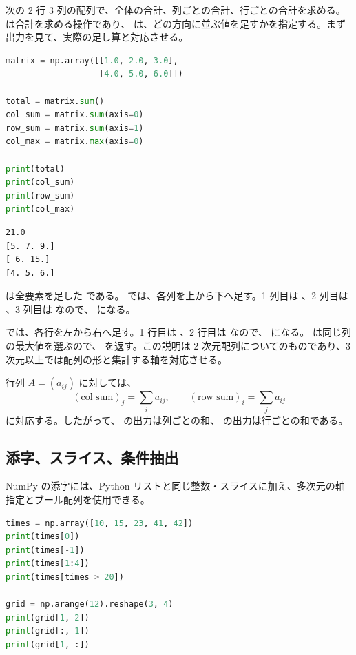 次の 2 行 3 列の配列で、全体の合計、列ごとの合計、行ごとの合計を求める。 は合計を求める操作であり、 は、どの方向に並ぶ値を足すかを指定する。まず出力を見て、実際の足し算と対応させる。

\begin{lstlisting}[language=Python]
matrix = np.array([[1.0, 2.0, 3.0],
                   [4.0, 5.0, 6.0]])

total = matrix.sum()
col_sum = matrix.sum(axis=0)
row_sum = matrix.sum(axis=1)
col_max = matrix.max(axis=0)

print(total)
print(col_sum)
print(row_sum)
print(col_max)
\end{lstlisting}

\begin{lstlisting}[numbers=none, xleftmargin=2\zw]
21.0
[5. 7. 9.]
[ 6. 15.]
[4. 5. 6.]
\end{lstlisting}

 は全要素を足した  である。 では、各列を上から下へ足す。1 列目は 、2 列目は 、3 列目は  なので、\code{[5., 7., 9.]} になる。

 では、各行を左から右へ足す。1 行目は 、2 行目は  なので、\code{[6., 15.]} になる。 は同じ列の最大値を選ぶので、\code{[4., 5., 6.]} を返す。この説明は 2 次元配列についてのものであり、3 次元以上では配列の形と集計する軸を対応させる。

行列 \(A = (a_{ij})\) に対しては、
\[
(\mathrm{col\_sum})_j = \sum_i a_{ij},\qquad
(\mathrm{row\_sum})_i = \sum_j a_{ij}
\]
に対応する。したがって、 の出力は列ごとの和、 の出力は行ごとの和である。

\subsection{添字、スライス、条件抽出}

NumPy の添字には、Python リストと同じ整数・スライスに加え、多次元の軸指定とブール配列を使用できる。

\begin{lstlisting}[language=Python]
times = np.array([10, 15, 23, 41, 42])
print(times[0])
print(times[-1])
print(times[1:4])
print(times[times > 20])

grid = np.arange(12).reshape(3, 4)
print(grid[1, 2])
print(grid[:, 1])
print(grid[1, :])
\end{lstlisting}

